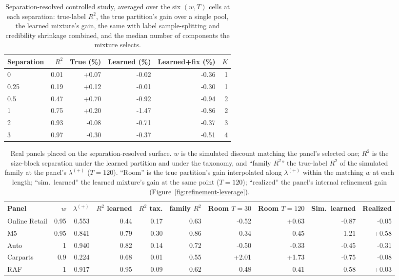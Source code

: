 \begin{table}[t]
\centering
\caption{Separation-resolved controlled study, averaged over the six
$(w,T)$ cells at each separation: true-label $R^2$, the true partition's
gain over a single pool, the learned mixture's gain, the same with label
sample-splitting and credibility shrinkage combined, and the median
number of components the mixture selects.}
\label{tab:sepsim}
\small
\setlength{\tabcolsep}{5pt}
\begin{tabular}{lrrrrr}
\toprule
Separation & $R^2$ & True (\%) & Learned (\%) & Learned+fix (\%) & $K$\\
\midrule
0 & 0.01 & +0.07 & -0.02 & -0.36 & 1\\
0.25 & 0.19 & +0.12 & -0.01 & -0.30 & 1\\
0.5 & 0.47 & +0.70 & -0.92 & -0.94 & 2\\
1 & 0.75 & +0.20 & -1.47 & -0.86 & 2\\
2 & 0.93 & -0.08 & -0.71 & -0.37 & 3\\
3 & 0.97 & -0.30 & -0.37 & -0.51 & 4\\
\bottomrule
\end{tabular}
\end{table}

\begin{table}[t]
\centering
\caption{Real panels placed on the separation-resolved surface. $w$ is the
simulated discount matching the panel's selected one; $R^2$ is the
size-block separation under the learned partition and under the taxonomy,
and ``family $R^2$'' the true-label $R^2$ of the simulated family at the
panel's $\lambda^{(+)}$ ($T{=}120$). ``Room'' is the true partition's gain
interpolated along $\lambda^{(+)}$ within the matching $w$ at each length;
``sim.\ learned'' the learned mixture's gain at the same point
($T{=}120$); ``realized'' the panel's internal refinement gain
(Figure~\ref{fig:refinement-leverage}).}
\label{tab:separation}
\small
\setlength{\tabcolsep}{4.5pt}
\begin{tabular}{lrrrrrrrrr}
\toprule
Panel & $w$ & $\lambda^{(+)}$ & $R^2$ learned & $R^2$ tax. & family $R^2$ & Room $T{=}30$ & Room $T{=}120$ & Sim.\ learned & Realized\\
\midrule
Online Retail & 0.95 & 0.553 & 0.44 & 0.17 & 0.63 & -0.52 & +0.63 & -0.87 & -0.05\\
M5 & 0.95 & 0.841 & 0.79 & 0.30 & 0.86 & -0.34 & -0.45 & -1.21 & +0.58\\
Auto & 1 & 0.940 & 0.82 & 0.14 & 0.72 & -0.50 & -0.33 & -0.45 & -0.31\\
Carparts & 0.9 & 0.224 & 0.68 & 0.01 & 0.55 & +2.01 & +1.73 & -0.75 & -0.08\\
RAF & 1 & 0.917 & 0.95 & 0.09 & 0.62 & -0.48 & -0.41 & -0.58 & +0.03\\
\bottomrule
\end{tabular}
\end{table}

